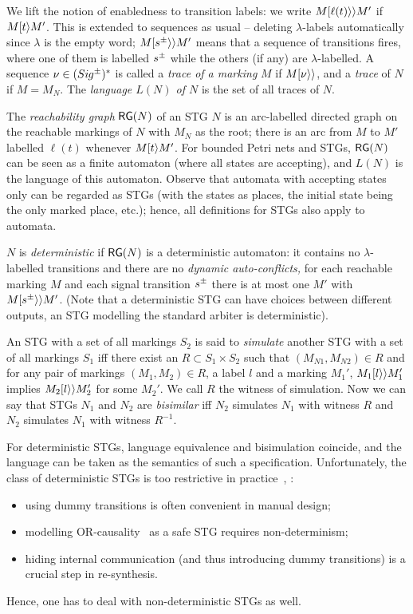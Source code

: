 \smallskip


We lift the notion of enabledness to transition labels: we write
$M[\ell(t)\rangle\rangle  M'$ if $M[t\rangle  M'$. This is extended to sequences
as usual -- deleting $\lambda$-labels automatically since $\lambda$
is the empty word; \ie $M[s^\pm\rangle\rangle M'$ means that a sequence of
transitions fires, where one of them is labelled $s^\pm$ while the
others (if any) are $\lambda$-labelled. A sequence
$\nu\in(\Sig\upd)^*$ is called a \emph{trace of a marking} $M$ if
$M[\nu\rangle\rangle$, and a \emph{trace} of $N$ if $M=M_N$. The \emph{language $L(N)$
of $N$} is the set of all traces of $N$.

\smallskip

The \emph{reachability graph} $\mathsf{RG}(N)$ of an STG $N$ is an arc-labelled
directed graph on the reachable markings of $N$ with $M_N$ as the root;
there is an arc from $M$ to $M'$ labelled $\ell(t)$ whenever
$M[t\rangle M'$. For bounded Petri nets and STGs, $\mathsf{RG}(N)$ can be seen as a finite automaton
(where all states are accepting), and $L(N)$ is the language of this
automaton.
Observe that automata with accepting states only can be
regarded as STGs (with the states as places, the initial state being the
only marked place, etc.); hence, all definitions for STGs also
apply to automata.

$N$ is \emph{deterministic} if $\mathsf{RG}(N)$
is a deterministic automaton: it contains no $\lambda$-labelled transitions
and there are no \emph{dynamic auto-conflicts,} \ie for each reachable marking $M$ and each signal transition $s^\pm$
there is at most one $M'$ with $M [s^\pm\rangle\rangle M'$. (Note that a deterministic STG
can have choices between different outputs, \eg an STG modelling
the standard arbiter is deterministic).

An STG with a set of all markings $S_2$ is said to \emph{simulate} another STG with 
a set of all markings $S_1$ iff there exist an 
$R \subset S_1 \times S_2$ such that $(M_{N 1},M_{N 2}) \in R$ and for any pair of markings 
$(M_1, M_2) \in R$, a label $l$ and a marking $M_1'$, $M_1[l\rangle\rangle  M_1'$ implies 
$M_2 [l\rangle\rangle M_2'$ for some $M_2'$. We call $R$ the witness of simulation. Now we can say that STGs $N_1$ and $N_2$ are \emph{bisimilar} iff $N_2$ simulates $N_1$ with witness $R$ and $N_2$ simulates $N_1$ with witness $R^{-1}$.

For deterministic STGs, language equivalence and bisimulation coincide, and the language can be taken as the semantics of such a specification. Unfortunately, the class of deterministic STGs is too restrictive in practice~\cite{KSV-08}, \eg:
\begin{itemize}
  \item using dummy transitions is often convenient in manual design;
  \item modelling OR-causality~\cite{ykklp96} as a safe STG requires non-determinism;
  \item hiding internal communication (and thus introducing dummy transitions) is a crucial step in re-synthesis.
\end{itemize}
Hence, one has to deal with non-deterministic STGs as well.

